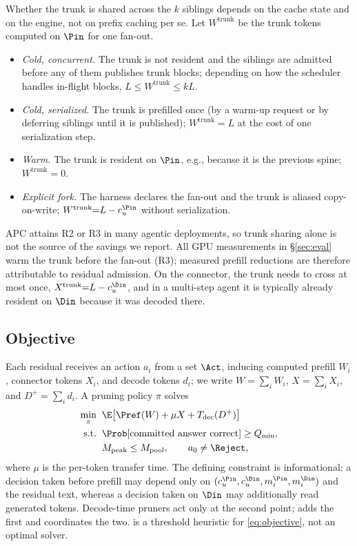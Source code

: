 Whether the trunk is shared across the $k$ siblings depends on the cache state and on the engine, not on prefix caching per se.
Let $W^{\mathrm{trunk}}$ be the trunk tokens computed on $\Pin$ for one fan-out.
\begin{itemize}[leftmargin=*,itemsep=1pt,topsep=2pt]
\item[\textbf{R1}] \emph{Cold, concurrent.} The trunk is not resident and the siblings are admitted before any of them publishes trunk blocks; depending on how the scheduler handles in-flight blocks, $L\le W^{\mathrm{trunk}}\le kL$.
\item[\textbf{R2}] \emph{Cold, serialized.} The trunk is prefilled once (by a warm-up request or by deferring siblings until it is published); $W^{\mathrm{trunk}}{=}L$ at the cost of one serialization step.
\item[\textbf{R3}] \emph{Warm.} The trunk is resident on $\Pin$, e.g., because it is the previous spine; $W^{\mathrm{trunk}}{=}0$.
\item[\textbf{R4}] \emph{Explicit fork.} The harness declares the fan-out and the trunk is aliased copy-on-write; $W^{\mathrm{trunk}}{=}L-c_u^{\Pin}$ without serialization.
\end{itemize}
APC attains R2 or R3 in many agentic deployments, so trunk sharing alone is not the source of the savings we report.
All GPU measurements in \S\ref{sec:eval} warm the trunk before the fan-out (R3); measured prefill reductions are therefore attributable to residual admission.
On the connector, the trunk needs to cross at most once, $X^{\mathrm{trunk}}{=}L-c_u^{\Din}$, and in a multi-step agent it is typically already resident on $\Din$ because it was decoded there.

\subsection{Objective}
\label{sec:objective}

Each residual receives an action $a_i$ from a set $\Act$, inducing computed prefill $W_i$, connector tokens $X_i$, and decode tokens $d_i$; we write $W{=}\sum_iW_i$, $X{=}\sum_iX_i$, and $D^{+}{=}\sum_id_i$.
A pruning policy $\pi$ solves
\begin{equation}
\label{eq:objective}
\begin{aligned}
\min_{\pi}\;\; & \E\bigl[\Pref(W)+\mu X+T_{\mathrm{dec}}(D^{+})\bigr]\\
\text{s.t.}\;\; & \Prob[\text{committed answer correct}]\ge Q_{\min},\\
& M_{\mathrm{peak}}\le M_{\mathrm{pool}},\qquad a_0\neq\Reject,
\end{aligned}
\end{equation}
where $\mu$ is the per-token transfer time.
The defining constraint is informational: a decision taken before prefill may depend only on $(c_u^{\Pin},c_u^{\Din},m_i^{\Pin},m_i^{\Din})$ and the residual text, whereas a decision taken on $\Din$ may additionally read generated tokens.
Decode-time pruners act only at the second point; \sys adds the first and coordinates the two.
\sys is a threshold heuristic for \eqref{eq:objective}, not an optimal solver.

